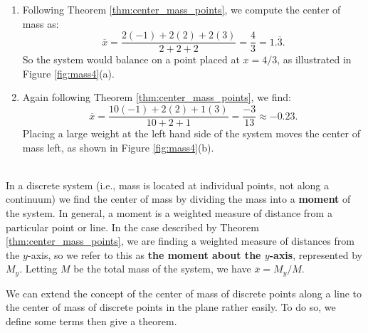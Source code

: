 {\begin{enumerate}
	\item Following Theorem \ref{thm:center_mass_points}, we compute the center of mass as:
	$$\overline{x}=\frac{2(-1) + 2(2)+2(3)}{2+2+2} = \frac43 = 1.\overline{3}.$$
	So the system would balance on a point placed at $x=4/3$, as illustrated in Figure \ref{fig:mass4}(a).
	
	\item	Again following Theorem \ref{thm:center_mass_points}, we find:
	$$\overline{x} = \frac{10(-1)+2(2)+1(3)}{10+2+1} = \frac{-3}{13} \approx -0.23.$$
	Placing a large weight at the left hand side of the system moves the center of mass left, as shown in Figure \ref{fig:mass4}(b).
\end{enumerate}
\baselineskip
}\\

In a discrete system (i.e., mass is located at individual points, not along a continuum) we find the center of mass by dividing the mass into a \textbf{moment} of the system. In general, a moment is a weighted measure of distance from a particular point or line. In the case described by Theorem \ref{thm:center_mass_points}, we are finding a weighted measure of distances from the $y$-axis, so we refer to this as \textbf{the moment about the $y$-axis}, represented by $M_y$.  Letting $M$ be the total mass of the system, we have  $\overline{x} = M_y/M$. 

We can extend the concept of the center of mass of discrete points along a line to the center of mass of discrete points in the plane rather easily. To do so, we define some terms then give a theorem.

